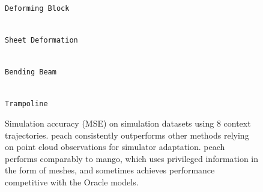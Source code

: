 \begin{figure}[t]
    \centering
    \makebox[\textwidth][c]{
        
    }
    \begin{minipage}{0.24\textwidth}
        \centering
        \scalebox{0.39}{}\\
        {\small \hspace{6mm}\texttt{Deforming Block}}
    \end{minipage}
    \begin{minipage}{0.24\textwidth}
        \centering
        \scalebox{0.39}{}\\
        {\small \hspace{4mm}\texttt{Sheet Deformation}}
    \end{minipage}
    \begin{minipage}{0.24\textwidth}
        \centering
        \scalebox{0.39}{}\\
        {\small \hspace{3mm}\texttt{Bending Beam}}
    \end{minipage}
    \begin{minipage}{0.24\textwidth}
        \centering
        \scalebox{0.39}{}\\
        {\small \hspace{4mm}\texttt{Trampoline}}
    \end{minipage}

    \caption{
        Simulation accuracy (MSE) on simulation datasets using 8 context trajectories.
        \gls{peach} consistently outperforms other methods relying on point cloud observations for simulator adaptation.
        \gls{peach} performs comparably to \gls{mango}, which uses privileged information in the form of meshes, and sometimes achieves performance competitive with the Oracle models.
    }
    \vspace{-0.4cm}
    \label{fig:main_results}
\end{figure}
